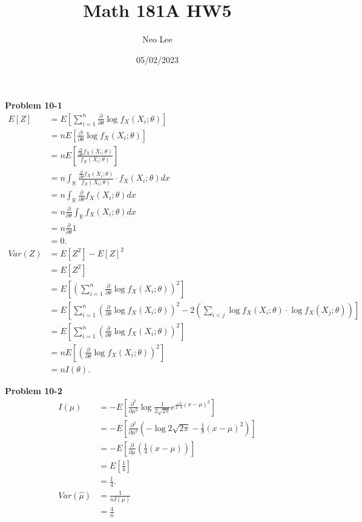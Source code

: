 \documentclass{article}
\title{Math 181A HW5}
\author{Neo Lee}
\date{05/02/2023}
\begin{document}
 

\maketitle 

\textbf{Problem 10-1}
\begin{align*}
    E[Z] & = E[\sum_{i=1}^{n}\frac{\partial}{\partial\theta}\log f_X(X_i;\theta)] \\
    & = nE[\frac{\partial}{\partial\theta}\log f_X(X_i;\theta)] \\
    & = nE[\frac{\frac{\partial}{\partial\theta}f_X(X_i;\theta)}{f_X(X_i;\theta)}] \\
    & = n\int_{\mathbb{R}} \frac{\frac{\partial}{\partial\theta}f_X(X_i;\theta)}{f_X(X_i;\theta)}\cdot f_X(X_i;\theta)dx \\
    & = n\int_{\mathbb{R}} \frac{\partial}{\partial\theta}f_X(X_i;\theta)dx \\
    & = n\frac{\partial}{\partial\theta}\int_{\mathbb{R}} f_X(X_i;\theta)dx \\
    & = n \frac{\partial}{\partial\theta}1 \\
    & = 0. \\
    Var(Z) & = E[Z^2] - E[Z]^2 \\
    & = E[Z^2] \\
    & = E\left[\left(\sum_{i=1}^{n}\frac{\partial}{\partial\theta}\log f_X(X_i;\theta)\right)^2\right] \\
    & = E\left[\sum_{i=1}^{n}\left(\frac{\partial}{\partial\theta}\log f_X(X_i;\theta)\right)^2- 2\left(\sum_{i<j}\log f_X(X_i;\theta)\cdot\log f_X(X_j;\theta)\right)\right] \\
    & = E\left[\sum_{i=1}^{n}\left(\frac{\partial}{\partial\theta}\log f_X(X_i;\theta)\right)^2\right] \\
    & = nE\left[\left(\frac{\partial}{\partial\theta}\log f_X(X_i;\theta)\right)^2\right] \\
    & = nI(\theta).
\end{align*}
\bigbreak

\textbf{Problem 10-2}
\begin{align*}
    I(\mu) & = -E\left[\frac{\partial^2}{\partial\mu^2}\log \frac{1}{2\sqrt{2\pi}}e^{\frac{-1}{2\cdot 4}(x-\mu)^2}\right] \\
    & = -E\left[\frac{\partial^2}{\partial\mu^2}\left(-\log 2\sqrt{2\pi}-\frac{1}{8}(x-\mu)^2\right)\right] \\
    & = -E\left[\frac{\partial}{\partial\mu}\left(\frac{1}{4}(x-\mu)\right)\right] \\
    & = E\left[\frac{1}{4}\right] \\
    & = \frac{1}{4}. \\
    Var(\hat{\mu}) & = \frac{1}{nI(\mu)} \\
    & = \frac{4}{n} \\
\end{align*}
\end{document}
